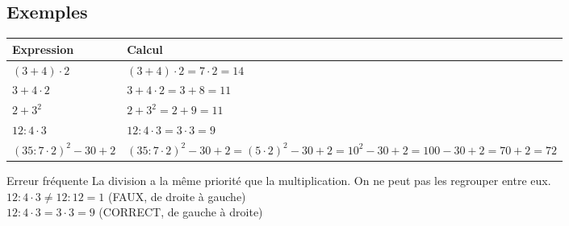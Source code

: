 \subsection{Exemples}

\vspace{-4pt}\def\arraystretch{1.15}
\begin{tabularx}{\linewidth}{|>{\centering\arraybackslash}p{4cm}|X|}
\hline
\cellcolor{themeNO!30}\textbf{Expression} & \cellcolor{themeNO!30}\textbf{Calcul} \\\hline
$(3 + 4) \cdot 2$ & $(3 + 4) \cdot 2 = 7 \cdot 2 = 14$ \\\hline
$3 + 4 \cdot 2$ & $3 + 4 \cdot 2 = 3 + 8 = 11$ \\\hline
$2 + 3^2$ & $2 + 3^2 = 2 + 9 = 11$ \\\hline
$12 : 4 \cdot 3$ & $12 : 4 \cdot 3 = 3 \cdot 3 = 9$ \\\hline
$(35:7\cdot2)^2 -30 + 2$ & $(35:7\cdot2)^2 -30 + 2 = (5\cdot2)^2 -30 + 2= 10^2 -30 + 2= 100 -30 + 2=70+2 =72$ \\\hline
\end{tabularx}
\def\arraystretch{1}

\begin{astuce}{Erreur fréquente}
La division a la même priorité que la multiplication. On ne peut pas les regrouper entre eux.\\[7pt]
$12 : 4 \cdot 3 \ne 12 : 12 = 1$ (FAUX, de droite à gauche)\\[3pt]
$12 : 4 \cdot 3 = 3 \cdot 3 =9$ (CORRECT, de gauche à droite)
\end{astuce}